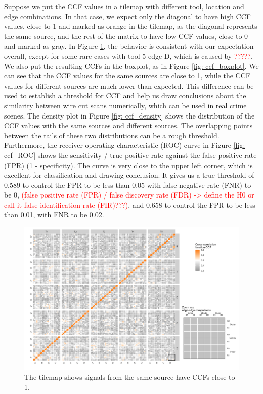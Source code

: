 \documentclass[fleqn,10pt]{wlscirep}
\begin{document}
Suppose we put the CCF values in a tilemap with different tool, location
and edge combinations. In that case, we expect only the diagonal to have
high CCF values, close to 1 and marked as orange in the tilemap, as the
diagonal represents the same source, and the rest of the matrix to have
low CCF values, close to 0 and marked as gray. In Figure
\ref{fig: ccf_tilemap}, the behavior is consistent with our expectation
overall, except for some rare cases with tool 5 edge D, which is caused
by \textcolor{red}{?????}. We also put the resulting CCFs in the
boxplot, as in Figure \ref{fig: ccf_boxplot}. We can see that the CCF
values for the same sources are close to 1, while the CCF values for
different sources are much lower than expected. This difference can be
used to establish a threshold for CCF and help us draw conclusions about
the similarity between wire cut scans numerically, which can be used in
real crime scenes. The density plot in Figure \ref{fig: ccf_density}
shows the distribution of the CCF values with the same sources and
different sources. The overlapping points between the tails of these two
distributions can be a rough threshold. Furthermore, the receiver
operating characteristic (ROC) curve in Figure \ref{fig: ccf_ROC} shows
the sensitivity / true positive rate against the false positive rate
(FPR) (1 - specificity). The curve is very close to the upper left
corner, which is excellent for classification and drawing conclusion. It
gives us a true threshold of 0.589 to control the FPR to be less than
0.05 with false negative rate (FNR) to be 0,
\textcolor{red}{(false positive rate (FPR) / false discovery rate (FDR) -> define the H0 or call it false identification rate (FIR)???)},
and 0.658 to control the FPR to be less than 0.01, with FNR to be 0.02.

\begin{figure}[ht]
\centering
\includegraphics[width=0.8\linewidth]{ccf_tilemap.png}
\caption{The tilemap shows signals from the same source have CCFs close to 1.}
\label{fig: ccf_tilemap}
\end{figure}
\end{document}
